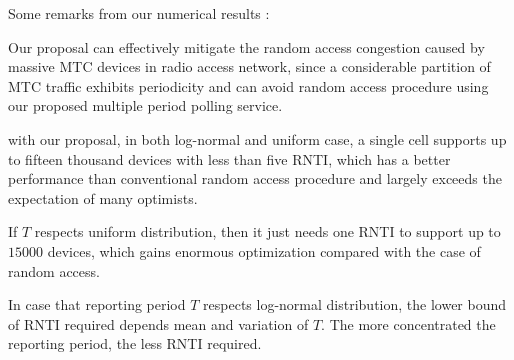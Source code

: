 Some remarks from our numerical results :
\begin{inparaenum}
	\item  Our proposal can effectively mitigate the random access congestion caused by massive MTC devices in radio access network, since a considerable partition of MTC traffic exhibits periodicity and can avoid random access procedure using our proposed multiple period polling service.
	\item  with our proposal, in both log-normal and uniform case, a single cell supports up to fifteen thousand devices with less than five RNTI, which has a better performance than conventional random access procedure and largely exceeds the expectation of many optimists.
	\item If $T$ respects uniform distribution, then it just needs one RNTI to support up to $15000$ devices, which gains enormous optimization compared with the case of random access.
	\item In case that reporting period $T$ respects log-normal distribution, the lower bound of RNTI required depends mean and variation of $T$. The more concentrated the reporting period, the less RNTI required.
\end{inparaenum} 